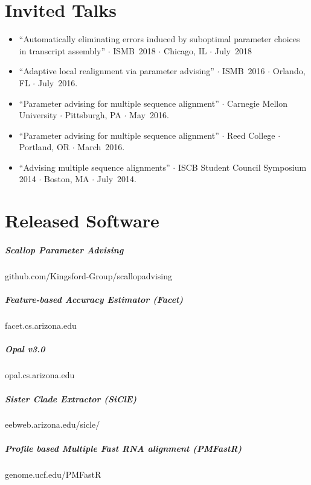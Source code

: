 \documentclass[10pt,letterpaper]{article}
\begin{document}







\section*{Invited Talks}

\begin{itemize}[leftmargin=*,labelindent=5pt,itemindent=-15pt]
    \item ``Automatically eliminating errors induced by suboptimal parameter choices in transcript assembly'' $\cdot$ ISMB~2018 $\cdot$ Chicago, IL $\cdot$ July~2018
    \item ``Adaptive local realignment via parameter advising'' $\cdot$ ISMB~2016 $\cdot$ Orlando, FL $\cdot$ July~2016.
    \item ``Parameter advising for multiple sequence alignment''  $\cdot$ Carnegie Mellon University $\cdot$ Pittsburgh, PA $\cdot$ May~2016. 
    \item ``Parameter advising for multiple sequence alignment''  $\cdot$ Reed College $\cdot$ Portland, OR $\cdot$ March~2016. 
    \item ``Advising multiple sequence alignments'' $\cdot$ ISCB Student Council Symposium 2014 $\cdot$  Boston, MA $\cdot$ July~2014.
   
\end{itemize}


\section*{Released Software}
\subparagraph{Scallop Parameter Advising}						github.com/Kingsford-Group/scallopadvising
\subparagraph{Feature-based Accuracy Estimator (Facet)} 			facet.cs.arizona.edu
\subparagraph{Opal v3.0}										opal.cs.arizona.edu 
\subparagraph{Sister Clade Extractor (SiClE)}						eebweb.arizona.edu/sicle/
\subparagraph{Profile based Multiple Fast RNA alignment (PMFastR)}	genome.ucf.edu/PMFastR 
\end{document}

